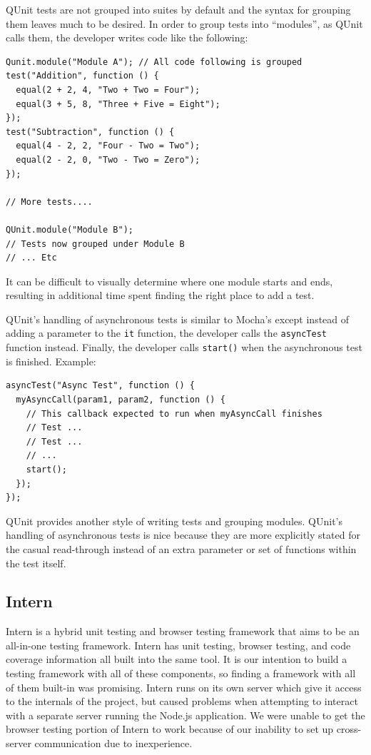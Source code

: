 \documentclass[12pt]{ucthesis}
\begin{document}
QUnit tests are not grouped into suites by default and the syntax for grouping them leaves much to be desired. In order to group tests into ``modules'', as QUnit calls them, the developer writes code like the following:
\begin{lstlisting}
Qunit.module("Module A"); // All code following is grouped
test("Addition", function () {
  equal(2 + 2, 4, "Two + Two = Four");
  equal(3 + 5, 8, "Three + Five = Eight");
});
test("Subtraction", function () {
  equal(4 - 2, 2, "Four - Two = Two");
  equal(2 - 2, 0, "Two - Two = Zero");
});

// More tests....

QUnit.module("Module B");
// Tests now grouped under Module B
// ... Etc
\end{lstlisting}
It can be difficult to visually determine where one module starts and ends, resulting in additional time spent finding the right place to add a test.

QUnit's handling of asynchronous tests is similar to Mocha's except instead of adding a parameter to the \lstinline{it} function, the developer calls the \lstinline{asyncTest} function instead. Finally, the developer calls \lstinline{start()} when the asynchronous test is finished. Example:
\begin{lstlisting}
asyncTest("Async Test", function () {
  myAsyncCall(param1, param2, function () {
    // This callback expected to run when myAsyncCall finishes
    // Test ...
    // Test ...
    // ...
    start();
  });
});
\end{lstlisting}

QUnit provides another style of writing tests and grouping modules. QUnit's handling of asynchronous tests is nice because they are more explicitly stated for the casual read-through instead of an extra parameter or set of functions within the test itself.

\subsection{Intern}
Intern\cite{InternIO} is a hybrid unit testing and browser testing framework that aims to be an all-in-one testing framework. Intern has unit testing, browser testing, and code coverage information all built into the same tool. It is our intention to build a testing framework with all of these components, so finding a framework with all of them built-in was promising. Intern runs on its own server which give it access to the internals of the project, but caused problems when attempting to interact with a separate server running the Node.js application. We were unable to get the browser testing portion of Intern to work because of our inability to set up cross-server communication due to inexperience.
\end{document}
